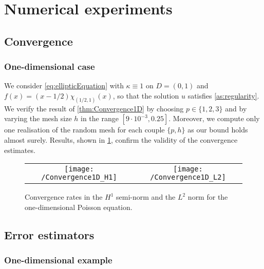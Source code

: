 \section{Numerical experiments}

\subsection{Convergence}

\subsubsection*{One-dimensional case} 

We consider \eqref{eq:ellipticEquation} with $\kappa \equiv 1$ on $D = (0, 1)$ and $f(x) = (x - 1/2)\chi_{(1/2, 1)}(x)$, so that the solution $u$ satisfies \cref{as:regularity}. We verify the result of \cref{thm:Convergence1D} by choosing $p \in \{1, 2, 3\}$ and by varying the mesh size $h$ in the range $[9\cdot 10^{-3}, 0.25]$. Moreover, we compute only one realisation of the random mesh for each couple $\{p, h\}$ as our bound holds almost surely. Results, shown in \cref{fig:Convergence1D}, confirm the validity of the convergence estimates.
\begin{figure}[t]
	\centering
	\begin{tabular}{cc}
		\texttt{[image: /Convergence1D\_H1]} & \texttt{[image: /Convergence1D\_L2]} \\
	\end{tabular}
	\caption{Convergence rates in the $H^1$ semi-norm and the $L^2$ norm for the one-dimensional Poisson equation.}
	\label{fig:Convergence1D}
\end{figure}

\subsection{Error estimators}

\subsubsection*{One-dimensional example}

